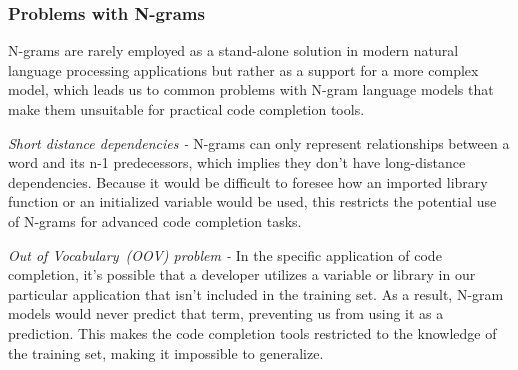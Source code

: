 \subsubsection{Problems with N-grams}
N-grams are rarely employed as a stand-alone solution in modern natural language processing applications but rather as a support for a more complex model, which leads us to common problems with N-gram language models that make them unsuitable for practical code completion tools.

\emph{Short distance dependencies -} N-grams can only represent relationships between a word and its n-1 predecessors, which implies they don't have long-distance dependencies. Because it would be difficult to foresee how an imported library function or an initialized variable would be used, this restricts the potential use of N-grams for advanced code completion tasks.

\emph{Out of Vocabulary~(OOV) problem - } In the specific application of code completion, it's possible that a developer utilizes a variable or library in our particular application that isn't included in the training set. 
As a result, N-gram models would never predict that term, preventing us from using it as a prediction. This makes the code completion tools restricted to the knowledge of the training set, making it impossible to generalize.

